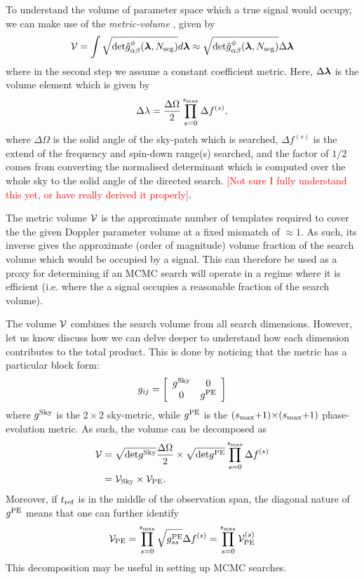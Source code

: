 \documentclass[aps, prd, twocolumn, superscriptaddress, floatfix, showpacs, nofootinbib, longbibliography]{revtex4-1}
\newcommand{\comment}[1]{\textcolor{red}{[#1]}}
\begin{document}
To understand the volume of parameter space which a true signal would occupy,
we can make use of the \emph{metric-volume} \citep{prix2007}, given by
\begin{align}
\mathcal{V} = \int 
\sqrt{\textrm{det}\hat{g}^{\phi}_{\alpha\beta}(\boldsymbol{\mathbf{\lambda}}, N_{\rm seg})} d\boldsymbol{\mathbf{\lambda}} \approx 
\sqrt{\textrm{det}\hat{g}^{\phi}_{\alpha\beta}(\boldsymbol{\mathbf{\lambda}}, N_{\rm seg})} \Delta\boldsymbol{\mathbf{\lambda}}
\end{align}
where in the second step we assume a constant coefficient metric. Here, $\Delta
\boldsymbol{\mathbf{\lambda}}$ is the volume element which is given by 
\begin{equation}
\Delta\lambda = \frac{\Delta\Omega}{2}
\prod_{s=0}^{s_{\textrm{max}}} \Delta f^{(s)},
\end{equation}
where $\Delta\Omega$ is the solid angle of the sky-patch which is searched,
$\Delta f^(s)$ is the extend of the frequency and spin-down range(s) searched,
and the factor of $1/2$ comes from converting the normalised determinant which
is computed over the whole sky to the solid angle of the directed search.
\comment{Not sure I fully understand this yet, or have really derived it properly}.

The metric volume $\mathcal{V}$ is the approximate number of templates required to cover
the the given Doppler parameter volume at a fixed mismatch of $\approx 1$. As
such, its inverse gives the approximate (order of magnitude) volume fraction of
the search volume which would be occupied by a signal. This can therefore be
used as a proxy for determining if an MCMC search will operate in a regime where
it is efficient (i.e. where the a signal occupies a reasonable fraction of the
search volume).

The volume $\mathcal{V}$ combines the search volume from all search dimensions. However,
let us know discuss how we can delve deeper to understand how each dimension
contributes to the total product. This is done by noticing that the metric has
a particular block form:
\begin{align}
g_{ij} = \left[
\begin{array}{cc}
g^{\rm Sky} & 0 \\
0 & g^{\rm PE}
\end{array}
\right]
\end{align}
where $g^{\rm Sky}$ is the $2\times2$ sky-metric, while $g^{\rm PE}$ is the
$(s_{\textrm{max}}{+}1){\times}(s_{\textrm{max}}{+}1)$ phase-evolution metric.
As such, the volume can be decomposed as
\begin{align}
\mathcal{V} & =
\sqrt{\textrm{det}g^{\rm Sky}}\frac{\Delta\Omega}{2} \times
\sqrt{\textrm{det}g^{\rm PE}}\prod_{s=0}^{s_{\textrm{max}}}\Delta f^{(s)} \\
& = \mathcal{V}_{\rm Sky} \times \mathcal{V}_{\rm PE}.
\label{eqn_metric_volume}
\end{align}
Moreover, if $t_{\rm ref}$ is in the middle of the observation span, the diagonal
nature of $g^{\rm PE}$ means that one can further identify
\begin{align}
\mathcal{V}_{\rm PE} = \prod_{s=0}^{s_{\textrm{max}}}\sqrt{g^{\rm PE}_{ss}} \Delta f^{(s)}
= \prod_{s=0}^{s_{\textrm{max}}}\mathcal{V}_{\rm PE}^{(s)}
\end{align}
This decomposition may be useful in setting up MCMC searches.
\end{document}
